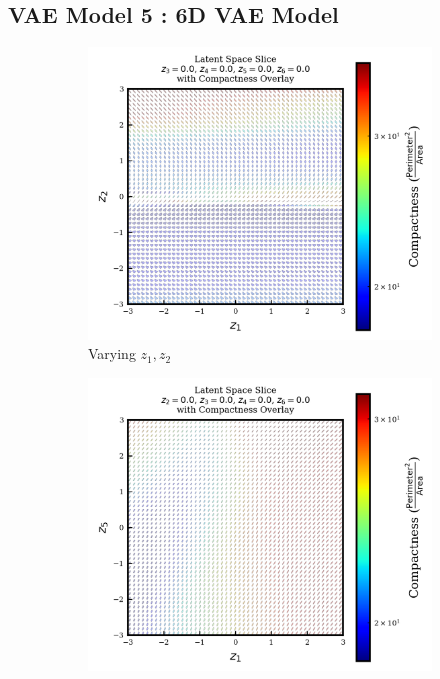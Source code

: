 \documentclass{article}
\begin{document}
\subsection{VAE Model 5 : 6D VAE Model}\label{model5_appendix}

\begin{figure}[H]
    \centering
    \begin{subfigure}{0.3\textwidth}
        \includegraphics[width=\linewidth]{figures/VAEmodels/model5/varying_z1_z2_fixed_z3=0.0_z4=0.0_z5=0.0_z6=0.0.png}
        \caption{Varying $z_1, z_2$}
    \end{subfigure}
    \hfill
    \begin{subfigure}{0.3\textwidth}
        \includegraphics[width=\linewidth]{figures/VAEmodels/model5/varying_z1_z5_fixed_z2=0.0_z3=0.0_z4=0.0_z6=0.0.png}

\end{subfigure}
\end{figure}
\end{document}
